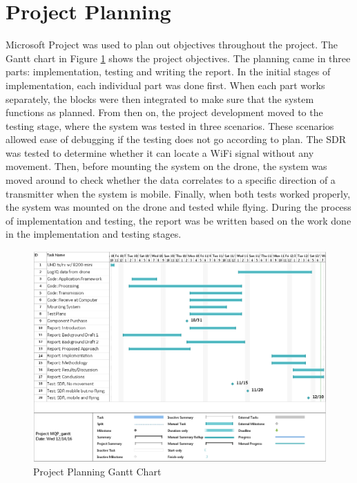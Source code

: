 \section{Project Planning}
Microsoft Project was used to plan out objectives throughout the project. The Gantt chart in Figure \ref{fig:gantt_chart} shows the project objectives. The planning came in three parts: implementation, testing and writing the report. In the initial stages of implementation, each individual part was done first. When each part works separately, the blocks were then integrated to make sure that the system functions as planned. From then on, the project development moved to the testing stage, where the system was tested in three scenarios. These scenarios allowed ease of debugging if the testing does not go according to plan. The SDR was tested to determine whether it can locate a WiFi signal without any movement. Then, before mounting the system on the drone, the system was moved around to check whether the data correlates to a specific direction of a transmitter when the system is mobile. Finally, when both tests worked properly, the system was mounted on the drone and tested while flying. During the process of implementation and testing, the report was be written based on the work done in the implementation and testing stages.
\begin{figure}[ht]
\centering
\includegraphics[width=.75\textwidth]{img/oct_gantt_chart.png}
\caption{Project Planning Gantt Chart}
\label{fig:gantt_chart}
\end{figure}
